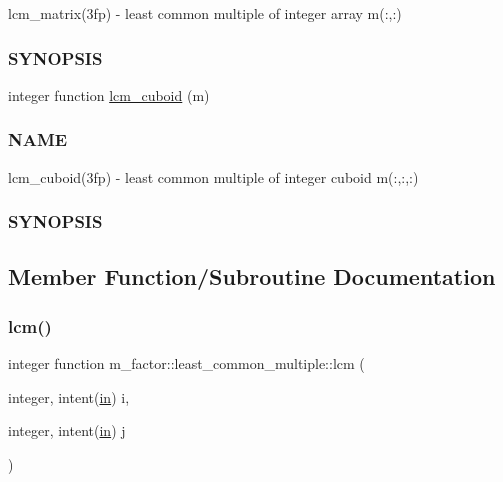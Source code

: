 \begin{DoxyCompactItemize}
\begin{DoxyCompactList}
lcm\+\_\+matrix(3fp) -\/ least common multiple of integer array m(\+:,\+:) \subsubsection*{S\+Y\+N\+O\+P\+S\+IS}\end{DoxyCompactList}\item 
integer function \hyperlink{interfacem__factor_1_1least__common__multiple_abfaed588cda0f7adc9a13933c05d4653}{lcm\+\_\+cuboid} (m)
\begin{DoxyCompactList}\small\item\em \subsubsection*{N\+A\+ME}

lcm\+\_\+cuboid(3fp) -\/ least common multiple of integer cuboid m(\+:,\+:,\+:) \subsubsection*{S\+Y\+N\+O\+P\+S\+IS}\end{DoxyCompactList}\end{DoxyCompactItemize}


\subsection{Member Function/\+Subroutine Documentation}
\mbox{\label{interfacem__factor_1_1least__common__multiple_aca2f4d6fbd586ba4c773be0526f926a9}} 
\subsubsection{\texorpdfstring{lcm()}{lcm()}}
{\footnotesize\ttfamily integer function m\+\_\+factor\+::least\+\_\+common\+\_\+multiple\+::lcm (\begin{DoxyParamCaption}\item[{integer, intent(\hyperlink{M__journal_83_8txt_afce72651d1eed785a2132bee863b2f38}{in})}]{i,  }\item[{integer, intent(\hyperlink{M__journal_83_8txt_afce72651d1eed785a2132bee863b2f38}{in})}]{j }\end{DoxyParamCaption})\hspace{0.3cm}{\ttfamily [private]}}



